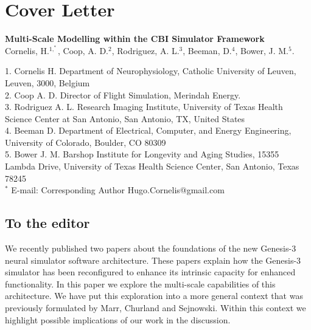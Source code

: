 \documentclass[12pt]{article}
\begin{document}
\section*{Cover Letter}

\begin{flushleft}
{\large
\textbf{Multi-Scale Modelling within the CBI Simulator Framework}
}
\\
Cornelis, H.$^{1,^\ast}$, 
Coop, A. D.$^{2}$,
Rodriguez, A. L.$^{3}$, 
Beeman, D.$^{4}$,
Bower, J. M.$^{5}$.
\\
\vspace*{5mm}
\begin{small}
{1.} Cornelis H. Department of Neurophysiology, Catholic University of Leuven, Leuven, 3000, Belgium
\\
{2.} Coop A. D. Director of Flight Simulation, Merindah Energy.
\\
{3.} Rodriguez A. L. Research Imaging Institute, University of Texas Health Science Center at San Antonio, San Antonio, TX, United States
\\
{4.} Beeman D. Department of Electrical, Computer, and Energy Engineering, University of Colorado, Boulder, CO 80309
\\
{5.} Bower J. M. Barshop Institute for Longevity and Aging Studies, 15355 Lambda Drive, University of Texas Health Science Center, San Antonio, Texas  78245
\\
$^\ast$ E-mail: Corresponding Author Hugo.Cornelis@gmail.com
\end{small}
\end{flushleft}

\doublespacing


\subsection*{To the editor}

We recently published two papers about the foundations of the new
Genesis-3 neural simulator software architecture.  These papers
explain how the Genesis-3 simulator has been reconfigured to enhance
its intrinsic capacity for enhanced functionality.  In this paper we
explore the multi-scale capabilities of this architecture.  We have
put this exploration into a more general context that was previously
formulated by Marr, Churland and Sejnowski.  Within this context we
highlight possible implications of our work in the discussion.
\end{document}
